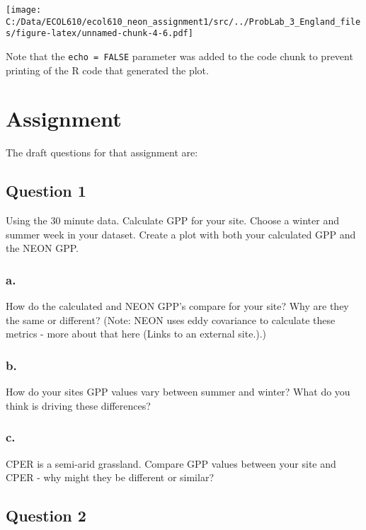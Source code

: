 \documentclass[
]{article}
\begin{document}
\texttt{[image: C:/Data/ECOL610/ecol610\_neon\_assignment1/src/../ProbLab\_3\_England\_files/figure-latex/unnamed-chunk-4-6.pdf]}

Note that the \texttt{echo\ =\ FALSE} parameter was added to the code
chunk to prevent printing of the R code that generated the plot.

\hypertarget{assignment}{%
\section{Assignment}\label{assignment}}

The draft questions for that assignment are:

\hypertarget{question-1-1}{%
\subsection{Question 1}\label{question-1-1}}

Using the 30 minute data. Calculate GPP for your site. Choose a winter
and summer week in your dataset. Create a plot with both your calculated
GPP and the NEON GPP.

\hypertarget{a.}{%
\subsubsection{a.}\label{a.}}

How do the calculated and NEON GPP's compare for your site? Why are they
the same or different? (Note: NEON uses eddy covariance to calculate
these metrics - more about that here (Links to an external site.).)

\hypertarget{b.}{%
\subsubsection{b.}\label{b.}}

How do your sites GPP values vary between summer and winter? What do you
think is driving these differences?

\hypertarget{c.}{%
\subsubsection{c.~}\label{c.}}

CPER is a semi-arid grassland. Compare GPP values between your site and
CPER - why might they be different or similar?

\hypertarget{question-2-1}{%
\subsection{Question 2}\label{question-2-1}}
\end{document}
